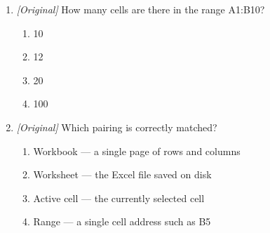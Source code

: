 \documentclass[11pt]{article}
\begin{document}
\begin{enumerate}[label=\textbf{Q\arabic*.}, leftmargin=*]
\begin{enumerate}[label=\Alph*.]
    \item I and II only
    \item II and III only
    \item I and III only
    \item I, II, and III
  \end{enumerate}
\item \textit{[Original]} How many cells are there in the range A1:B10?
  \begin{enumerate}[label=\Alph*.]
    \item 10
    \item 12
    \item 20
    \item 100
  \end{enumerate}
\item \textit{[Original]} Which pairing is correctly matched?
  \begin{enumerate}[label=\Alph*.]
    \item Workbook --- a single page of rows and columns
    \item Worksheet --- the Excel file saved on disk
    \item Active cell --- the currently selected cell
    \item Range --- a single cell address such as B5
  \end{enumerate}


\end{enumerate}
\end{document}
